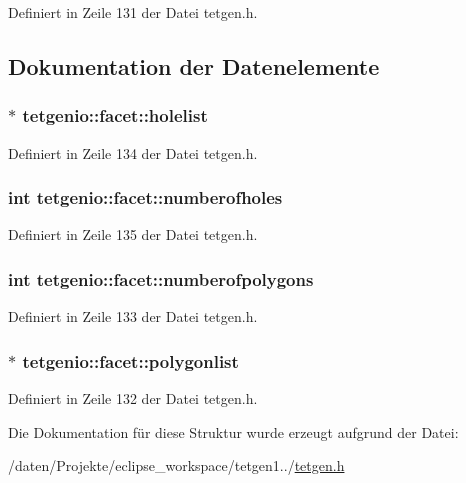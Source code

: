 Definiert in Zeile 131 der Datei tetgen.\-h.



\subsection{Dokumentation der Datenelemente}
\hypertarget{structtetgenio_1_1facet_aecc34fbcd7087b45baecf2ba43d57757}{
\subsubsection[{holelist}]{$\ast$ tetgenio\-::facet\-::holelist}}\label{structtetgenio_1_1facet_aecc34fbcd7087b45baecf2ba43d57757}


Definiert in Zeile 134 der Datei tetgen.\-h.

\hypertarget{structtetgenio_1_1facet_acc9857df4007aa20199f8979353339c7}{
\subsubsection[{numberofholes}]{\setlength{\rightskip}{0pt plus 5cm}int tetgenio\-::facet\-::numberofholes}}\label{structtetgenio_1_1facet_acc9857df4007aa20199f8979353339c7}


Definiert in Zeile 135 der Datei tetgen.\-h.

\hypertarget{structtetgenio_1_1facet_a845d93a1341532b2f0de8b1e75a5d0bb}{
\subsubsection[{numberofpolygons}]{\setlength{\rightskip}{0pt plus 5cm}int tetgenio\-::facet\-::numberofpolygons}}\label{structtetgenio_1_1facet_a845d93a1341532b2f0de8b1e75a5d0bb}


Definiert in Zeile 133 der Datei tetgen.\-h.

\hypertarget{structtetgenio_1_1facet_ad73474fc4f07efdd714f0441948c5dfa}{
\subsubsection[{polygonlist}]{$\ast$ tetgenio\-::facet\-::polygonlist}}\label{structtetgenio_1_1facet_ad73474fc4f07efdd714f0441948c5dfa}


Definiert in Zeile 132 der Datei tetgen.\-h.



Die Dokumentation für diese Struktur wurde erzeugt aufgrund der Datei\-:\begin{DoxyCompactItemize}
\item 
/daten/\-Projekte/eclipse\-\_\-workspace/tetgen1../\hyperlink{tetgen_8h}{tetgen.\-h}\end{DoxyCompactItemize}
